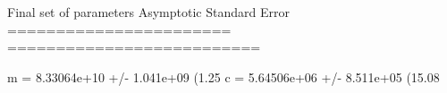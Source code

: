 Final set of parameters            Asymptotic Standard Error
=======================            ==========================

m               = 8.33064e+10      +/- 1.041e+09    (1.25%
c               = 5.64506e+06      +/- 8.511e+05    (15.08%
